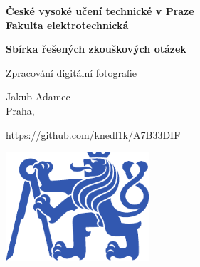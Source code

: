 \documentclass[11pt,a4paper]{article}
\begin{document}
 

\begin{titlepage}
    \centering
    \vspace*{2cm}

    {\Large \textbf{České vysoké učení technické v Praze}\\}
    \vspace{0.2cm}
    {\Large \textbf{Fakulta elektrotechnická}\\}
    
    \vspace{1cm}
    {\Huge \textbf{Sbírka řešených zkouškových otázek}\\}

    \vspace{0.5cm}
    {\Large Zpracování digitální fotografie\\}

    \vspace{2cm}
    { Jakub Adamec\\}
    { Praha, \the\year\\}

    \vspace{2cm}
    { \url{https://github.com/knedl1k/A7B33DIF}}

    \vspace{2cm}
    \includegraphics[width=0.4\textwidth]{media/symbol_cvut_plna_samostatna_verze_Pantone.pdf}

    \vfill
    
\end{titlepage}

\clearpage
{}
\setcounter{page}{1}

\tableofcontents
{}

\clearpage
{}
\setcounter{page}{1} 




 
\end{document}
